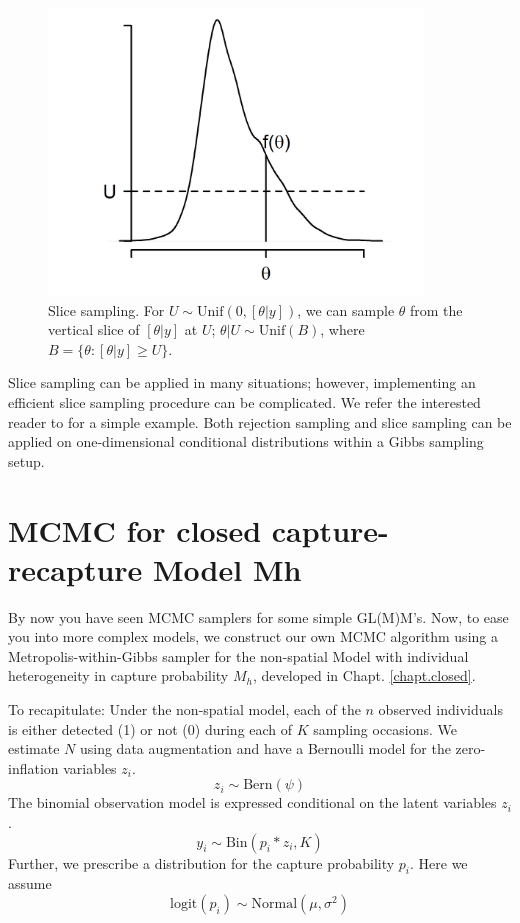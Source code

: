 \begin{figure}
\begin{center}
\includegraphics[height=3in]{Ch7/figs/slicesampling}
\end{center}
\caption{
Slice sampling. For 
$U \sim \mbox{Unif}(0, [\theta|y])$, 
we can sample $\theta$ from the vertical slice of $[\theta|y]$ at $U$; 
$\theta|U \sim \mbox{Unif}(B)$, 
where $B = \{ \theta: [\theta|y] \geq U\}$.
}
\label{mcmc.fig.slicesample}
\end{figure}


Slice sampling can be applied in many situations; however,
implementing an efficient slice sampling procedure can be
complicated. We refer the interested reader to 
\citet[][Chapt. 7]{robert_casella:2010} for a simple example.  Both rejection
sampling and slice sampling can be applied on one-dimensional
conditional distributions within a Gibbs sampling setup.

\section{MCMC for closed capture-recapture Model Mh}

By now you have seen MCMC samplers for some simple GL(M)M's. Now, to
ease you into more complex models, we construct our own MCMC algorithm
using a Metropolis-within-Gibbs sampler for the non-spatial Model with
individual heterogeneity in capture probability $M_{h}$, developed in
Chapt. \ref{chapt.closed}.

To recapitulate: Under the non-spatial model, each of the $n$ observed
individuals is either detected (1) or not (0) during each of $K$
sampling occasions. We estimate $N$ using data augmentation and have a
Bernoulli model for the zero-inflation variables $z_{i}$. 
\[
z_{i} \sim \mbox{Bern}(\psi)
\]
The binomial
observation model is expressed conditional on the latent variables
$z_{i}$. 
\[
y_i \sim \mbox{Bin} (p_i * z_i, K)
\]
Further, we prescribe a distribution for the capture
probability $p_{i}$. Here we assume
\[
\mathrm{logit}(p_{i}) \sim \mbox{Normal}(\mu,\sigma^2)
\]

